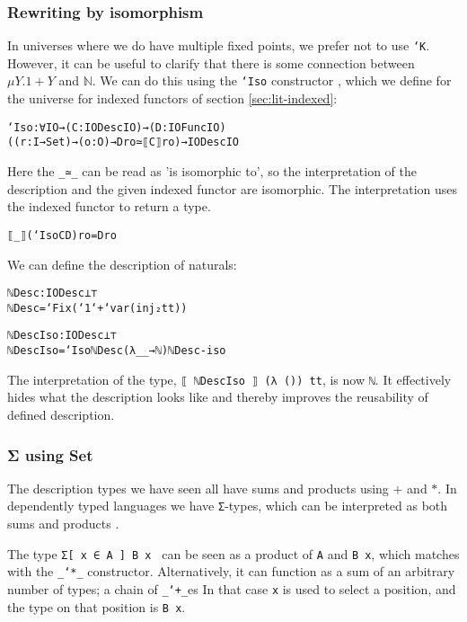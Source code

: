 \subsubsection{Rewriting by isomorphism}

In universes where we do have multiple fixed points, we prefer not to
use \texttt{`K}.
However, it can be useful to clarify that there is some connection
between $μY. 1 + Y$ and $ℕ$.
We can do this using the \texttt{`Iso} constructor \cite{loeh11},
which we define for the universe for indexed functors of section
\ref{sec:lit-indexed}:

\begin{alltt}
`Iso : ∀{I O} → (C : IODesc I O) → (D : IOFunc I O)
       ((r : I → Set) → (o : O) → D r o ≃ ⟦ C ⟧ r o) → IODesc I O
\end{alltt}

Here the \texttt{\_≃\_} can be read as 'is isomorphic to', so the
interpretation of the description and the given indexed functor are
isomorphic.
The interpretation uses the indexed functor to return a type.

\begin{alltt}
⟦_⟧ (`Iso C D) r o = D r o
\end{alltt}

\begin{example}
We can define the description of naturals:

\begin{alltt}
ℕDesc : IODesc ⊥ ⊤
ℕDesc = `Fix (`1 `+ `var (inj₂ tt))

ℕDescIso : IODesc ⊥ ⊤
ℕDescIso = `Iso ℕDesc (λ _ _ → ℕ) ℕDesc-iso
\end{alltt}

The interpretation of the type, \texttt{⟦ ℕDescIso ⟧ (λ ()) tt}, is
now \texttt{ℕ}.
It effectively hides what the description looks like and thereby
improves the reusability of defined description.
\end{example}

\subsubsection{Σ using Set}

The description types we have seen all have sums and products using
$+$ and $*$.
In dependently typed languages we have \texttt{Σ}-types, which can be
interpreted as both sums and products \cite{chapman10}.

The type \texttt{Σ[ x ∈ A ] B x } can be seen as a product of
\texttt{A} and \texttt{B x}, which matches with the \texttt{\_`*\_}
constructor.
Alternatively, it can function as a sum of an arbitrary number of
types; a chain of \texttt{\_`+\_}es
In that case \texttt{x} is used to select a position, and the type on
that position is \texttt{B x}.

